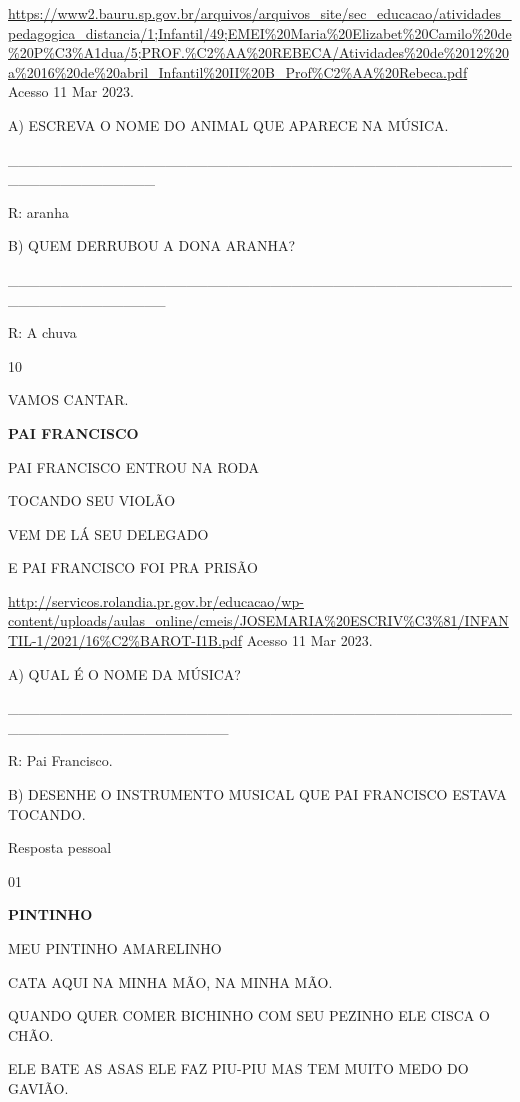 {{\url{https://www2.bauru.sp.gov.br/arquivos/arquivos_site/sec_educacao/atividades_pedagogica_distancia/1;Infantil/49;EMEI\%20Maria\%20Elizabet\%20Camilo\%20de\%20P\%C3\%A1dua/5;PROF.\%C2\%AA\%20REBECA/Atividades\%20de\%2012\%20a\%2016\%20de\%20abril_Infantil\%20II\%20B_Prof\%C2\%AA\%20Rebeca.pdf}
Acesso 11 Mar 2023.

A) ESCREVA O NOME DO ANIMAL QUE APARECE NA MÚSICA.

\_\_\_\_\_\_\_\_\_\_\_\_\_\_\_\_\_\_\_\_\_\_\_\_\_\_\_\_\_\_\_\_\_\_\_\_\_\_\_\_\_\_\_\_\_\_\_\_\_\_\_\_\_\_\_\_\_\_\_\_\_\_

R: aranha

B) QUEM DERRUBOU A DONA ARANHA?

\_\_\_\_\_\_\_\_\_\_\_\_\_\_\_\_\_\_\_\_\_\_\_\_\_\_\_\_\_\_\_\_\_\_\_\_\_\_\_\_\_\_\_\_\_\_\_\_\_\_\_\_\_\_\_\_\_\_\_\_\_\_\_

R: A chuva

\num{10}

VAMOS CANTAR.

\textbf{PAI FRANCISCO}

PAI FRANCISCO ENTROU NA RODA

TOCANDO SEU VIOLÃO

VEM DE LÁ SEU DELEGADO

E PAI FRANCISCO FOI PRA PRISÃO

\url{http://servicos.rolandia.pr.gov.br/educacao/wp-content/uploads/aulas_online/cmeis/JOSEMARIA\%20ESCRIV\%C3\%81/INFANTIL-1/2021/16\%C2\%BAROT-I1B.pdf}
Acesso 11 Mar 2023.

A) QUAL É O NOME DA MÚSICA?

\_\_\_\_\_\_\_\_\_\_\_\_\_\_\_\_\_\_\_\_\_\_\_\_\_\_\_\_\_\_\_\_\_\_\_\_\_\_\_\_\_\_\_\_\_\_\_\_\_\_\_\_\_\_\_\_\_\_\_\_\_\_\_\_\_\_\_\_\_

R: Pai Francisco.

B) DESENHE O INSTRUMENTO MUSICAL QUE PAI FRANCISCO ESTAVA TOCANDO.

Resposta pessoal


\num{01}

\textbf{PINTINHO}

MEU PINTINHO AMARELINHO

CATA AQUI NA MINHA MÃO, NA MINHA MÃO.

QUANDO QUER COMER BICHINHO COM SEU PEZINHO ELE CISCA O CHÃO.

ELE BATE AS ASAS ELE FAZ PIU-PIU MAS TEM MUITO MEDO DO GAVIÃO.

}}
